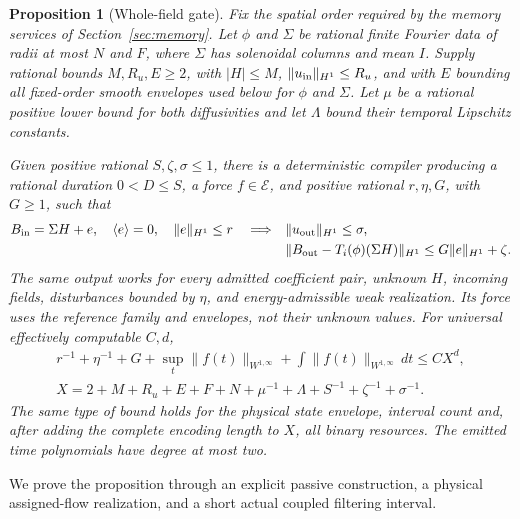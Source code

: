\documentclass[11pt,a4paper]{amsart}
\newtheorem{proposition}[theorem]{Proposition}
\theoremstyle{definition}
\theoremstyle{remark}
\numberwithin{equation}{section}
\newcommand{\Ecal}{\mathcal E}
\newcommand{\norm}[1]{\lVert #1\rVert}
\newcommand{\mean}[1]{\langle #1\rangle}
\begin{document}
\begin{proposition}[Whole-field gate]\label{prop:whole-field-gate}
Fix the spatial order required by the memory services of
Section~\ref{sec:memory}.  Let $\phi$ and $\Sigma$ be rational finite Fourier
data of radii at most $N$ and $F$, where $\Sigma$ has solenoidal columns and
mean $I$.  Supply rational bounds $M,R_u,E\ge2$, with $|H|\le M$,
$\norm{u_{\rm in}}_{H^1}\le R_u$, and with $E$ bounding all fixed-order
smooth envelopes used below for $\phi$ and $\Sigma$.  Let $\mu$ be a rational
positive lower bound for both diffusivities and let $\Lambda$ bound their
temporal Lipschitz constants.

Given positive rational $S,\zeta,\sigma\le1$, there is a deterministic
compiler producing a rational duration $0<D\le S$, a force $f\in\Ecal$,
and positive rational $r,\eta,G$, with $G\ge1$, such that
\begin{equation}\label{eq:gate-contract}
 \begin{split}
 B_{\rm in}=\Sigma H+e,\quad\mean e=0,\quad\norm e_{H^1}\le r
 \quad\Longrightarrow\quad
 &\norm{u_{\rm out}}_{H^1}\le\sigma,\\
 &\norm{B_{\rm out}-T_i(\phi)(\Sigma H)}_{H^1}
       \le G\norm e_{H^1}+\zeta .
 \end{split}
\end{equation}
The same output works for every admitted coefficient pair, unknown $H$,
incoming fields, disturbances bounded by $\eta$, and energy-admissible weak
realization.  Its force uses the reference family and envelopes, not their
unknown values.  For universal effectively computable $C,d$,
\begin{equation}\label{eq:gate-resources}
 \begin{gathered}
 r^{-1}+\eta^{-1}+G+\sup_t\norm{f(t)}_{W^{1,\infty}}
   +\int\norm{f(t)}_{W^{1,\infty}}\,dt\le CX^d,\\
 X=2+M+R_u+E+F+N+\mu^{-1}+\Lambda+S^{-1}+\zeta^{-1}+\sigma^{-1}.
 \end{gathered}
\end{equation}
The same type of bound holds for the physical state envelope, interval count
and, after adding the complete encoding length to $X$, all binary resources.
The emitted time polynomials have degree at most two.
\end{proposition}

We prove the proposition through an explicit passive construction, a physical
assigned-flow realization, and a short actual coupled filtering interval.
\end{document}
